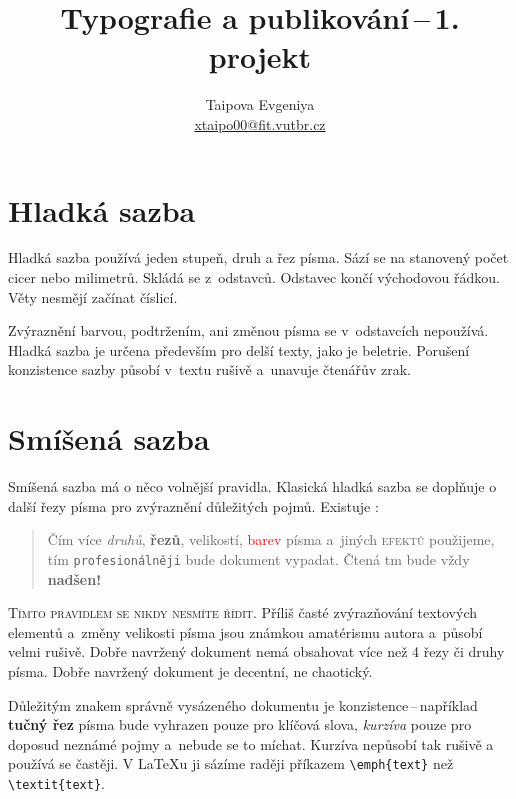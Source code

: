 \documentclass[a4paper, 10pt, twocolumn]{article}
\begin{document}
\title{Typografie a publikování\,--\,1. projekt}
\author{Taipova Evgeniya\\
\href{mailto:xtaipo00@stud.fit.vutbr.cz}{xtaipo00@fit.vutbr.cz}}
\date{}

\maketitle

\section{Hladká sazba}
Hladká sazba používá jeden stupeň, druh a řez písma.
Sází se na stanovený počet cicer nebo milimetrů.
Skládá se z~odstavců. Odstavec končí východovou řádkou.
Věty nesmějí začínat číslicí.

Zvýraznění barvou, podtržením, ani změnou písma se v~odstavcích nepoužívá.
Hladká sazba je určena především pro delší texty, jako je beletrie.
Porušení konzistence sazby působí v~textu rušivě a~unavuje čtenářův zrak.

\section{Smíšená sazba}
\label{2}

Smíšená sazba má o něco volnější pravidla.
Klasická hladká sazba se doplňuje o další řezy písma pro zvýraznění důležitých pojmů.
Existuje :

\begin{quotation}
Čím více \emph{druhů}, \textbf{řezů}, {\tiny velikostí}, \textcolor{red}{barev} písma a~jiných \textsc{efektů} použijeme, tím \texttt{profesionálněji} bude {\selectfont \Large dokument} vypadat. {\huge Č}{\LARGE t}{\Large e}{\large n}á{} {\footnotesize t}{}{\tiny m} bude vždy \textbf{\Huge nadšen!}\par
\end{quotation}

\indent\textsc{Tímto pravidlem se nikdy nesmíte řídit.}
Příliš časté zvýrazňování textových elementů a~změny velikosti písma jsou známkou amatérismu autora a~působí velmi rušivě.
Dobře navržený dokument nemá obsahovat více než 4 řezy či druhy písma.
Dobře navržený dokument je decentní, ne chaotický.

Důležitým znakem správně vysázeného dokumentu je konzistence\,--\,například \textbf{tučný řez} písma bude vyhrazen pouze pro klíčová slova, \emph{kurzíva} pouze pro doposud neznámé pojmy a~nebude se to míchat.
Kurzíva nepůsobí tak rušivě a používá se častěji.
V \LaTeX u ji sázíme raději příkazem \verb|\emph{text}| než \verb|\textit{text}|.
\end{document}
